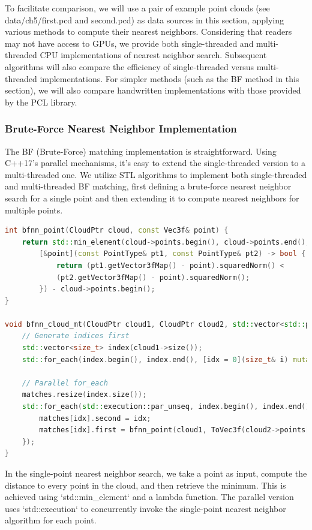 To facilitate comparison, we will use a pair of example point clouds (see data/ch5/first.pcd and second.pcd) as data sources in this section, applying various methods to compute their nearest neighbors. Considering that readers may not have access to GPUs, we provide both single-threaded and multi-threaded CPU implementations of nearest neighbor search. Subsequent algorithms will also compare the efficiency of single-threaded versus multi-threaded implementations. For simpler methods (such as the BF method in this section), we will also compare handwritten implementations with those provided by the PCL library.

\subsubsection{Brute-Force Nearest Neighbor Implementation}
The BF (Brute-Force) matching implementation is straightforward. Using C++17's parallel mechanisms, it's easy to extend the single-threaded version to a multi-threaded one. We utilize STL algorithms to implement both single-threaded and multi-threaded BF matching, first defining a brute-force nearest neighbor search for a single point and then extending it to compute nearest neighbors for multiple points.

\begin{lstlisting}[language=c++, caption=src/ch5/bfnn.cc]
int bfnn_point(CloudPtr cloud, const Vec3f& point) {
	return std::min_element(cloud->points.begin(), cloud->points.end(),
		[&point](const PointType& pt1, const PointType& pt2) -> bool {
			return (pt1.getVector3fMap() - point).squaredNorm() <
			(pt2.getVector3fMap() - point).squaredNorm();
		}) - cloud->points.begin();
}

void bfnn_cloud_mt(CloudPtr cloud1, CloudPtr cloud2, std::vector<std::pair<size_t, size_t>>& matches) {
	// Generate indices first
	std::vector<size_t> index(cloud1->size());
	std::for_each(index.begin(), index.end(), [idx = 0](size_t& i) mutable { i = idx++; });
	
	// Parallel for_each
	matches.resize(index.size());
	std::for_each(std::execution::par_unseq, index.begin(), index.end(), [&](auto idx) {
		matches[idx].second = idx;
		matches[idx].first = bfnn_point(cloud1, ToVec3f(cloud2->points[idx]));
	});
}
\end{lstlisting}

In the single-point nearest neighbor search, we take a point as input, compute the distance to every point in the cloud, and then retrieve the minimum. This is achieved using `std::min_element` and a lambda function. The parallel version uses `std::execution` to concurrently invoke the single-point nearest neighbor algorithm for each point.

